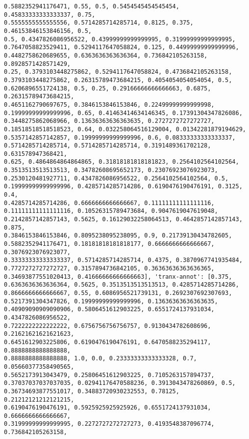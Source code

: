 \documentclass[11pt]{article}
\begin{document}
\begin{Verbatim}[commandchars=\\\{\}]
0.5882352941176471, 0.55, 0.5, 0.5454545454545454, 0.45833333333333337, 0.75,
0.5555555555555556, 0.5714285714285714, 0.8125, 0.375, 0.46153846153846156, 0.5,
0.5, 0.4347826086956522, 0.43999999999999995, 0.31999999999999995,
0.7647058823529411, 0.5294117647058824, 0.125, 0.44999999999999996,
0.4482758620689655, 0.6363636363636364, 0.736842105263158, 0.8928571428571429,
0.25, 0.3793103448275862, 0.5294117647058824, 0.4736842105263158,
0.3793103448275862, 0.26315789473684215, 0.4054054054054054, 0.5,
0.6206896551724138, 0.5, 0.25, 0.29166666666666663, 0.6875, 0.26315789473684215,
0.4651162790697675, 0.3846153846153846, 0.22499999999999998,
0.19999999999999996, 0.65, 0.41463414634146345, 0.17391304347826086,
0.3448275862068966, 0.13636363636363635, 0.2727272727272727,
0.18518518518518523, 0.64, 0.032258064516129004, 0.01342281879194629,
0.5357142857142857, 0.19999999999999996, 0.6, 0.08333333333333337,
0.5714285714285714, 0.5714285714285714, 0.3191489361702128, 0.631578947368421,
0.625, 0.4864864864864865, 0.31818181818181823, 0.2564102564102564,
0.3513513513513513, 0.34782608695652173, 0.23076923076923073,
0.2530120481927711, 0.4347826086956522, 0.2564102564102564, 0.5,
0.19999999999999996, 0.4285714285714286, 0.6190476190476191, 0.3125, 0.4,
0.4285714285714286, 0.6666666666666667, 0.11111111111111116,
0.11111111111111116, 0.10526315789473684, 0.9047619047619048,
0.2142857142857143, 0.5625, 0.16129032258064513, 0.4642857142857143, 0.875,
0.3846153846153846, 0.8095238095238095, 0.9, 0.21739130434782605,
0.5882352941176471, 0.18181818181818177, 0.6666666666666667, 0.3076923076923077,
0.33333333333333337, 0.5714285714285714, 0.4375, 0.3870967741935484,
0.7727272727272727, 0.3157894736842105, 0.36363636363636365,
0.34693877551020413, 0.41666666666666663], 'tranx-annot': [0.375,
0.6363636363636364, 0.5625, 0.3513513513513513, 0.4285714285714286,
0.8666666666666667, 0.55, 0.6086956521739131, 0.2692307692307693,
0.5217391304347826, 0.19999999999999996, 0.13636363636363635,
0.40909090909090906, 0.5806451612903225, 0.6551724137931034, 0.4347826086956522,
0.7222222222222222, 0.6756756756756757, 0.9130434782608696, 0.21621621621621623,
0.6451612903225806, 0.6190476190476191, 0.6470588235294117, 0.8888888888888888,
0.8888888888888888, 1.0, 0.0, 0.23333333333333328, 0.7, 0.05660377358490565,
0.5652173913043479, 0.25806451612903225, 0.7105263157894737,
0.37037037037037035, 0.02941176470588236, 0.3913043478260869, 0.5,
0.36734693877551017, 0.34883720930232553, 0.78125, 0.21212121212121215,
0.6190476190476191, 0.5925925925925926, 0.6551724137931034, 0.6666666666666667,
0.31999999999999995, 0.2272727272727273, 0.4193548387096774, 0.736842105263158,

\end{Verbatim}
\end{document}
